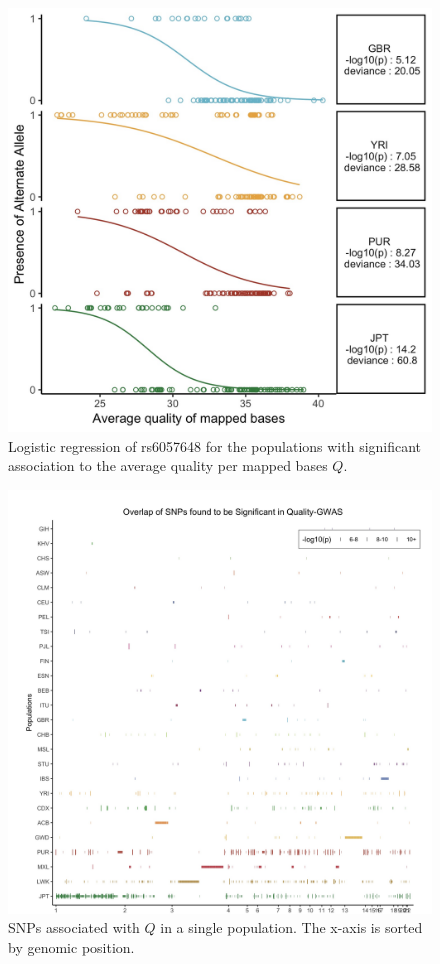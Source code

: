 \documentclass[9pt,lineno]{elife}
\begin{document}
\begin{figure}[h]
\includegraphics[width=\hsize,keepaspectratio]{./Figures/RegressionPlot.jpg}
\caption{Logistic regression of rs6057648 for the populations with significant association to the average quality per mapped bases $Q$.}
\label{TwinsSNP}
\end{figure}

\begin{figure}[h]
\includegraphics[width=\hsize,keepaspectratio]{./Figures/SNP6_Singles.jpg}
\caption{SNPs associated with $Q$ in a single population. The x-axis is sorted by genomic position.}
\label{Singles}
\end{figure}
\end{document}
